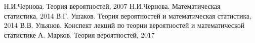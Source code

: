 \begin{thebibliography}{1}
		Н.И.Чернова.
		Теория вероятностей,
		2007
		Н.И.Чернова.
		Математическая статистика,
		2014
		В.Г. Ушаков.
		Теория вероятностей и математическая статистика,
		2014
		В.В. Ульянов.
		Конспект лекций по теории вероятностей и математической статистике
		А. Марков.
		Теория вероятностей,
		2017
\end{thebibliography}

